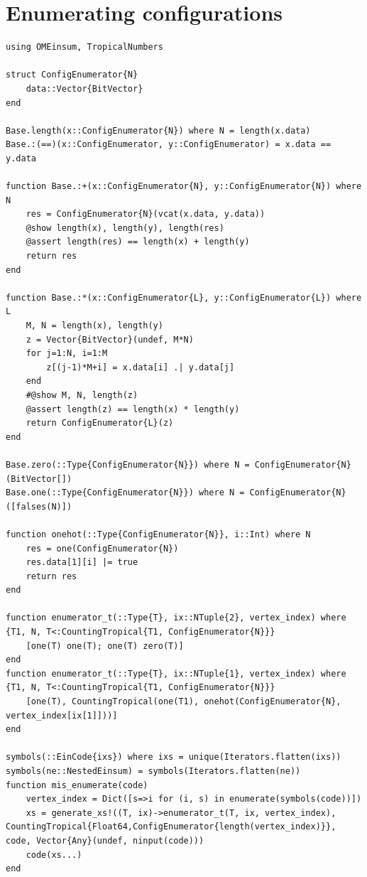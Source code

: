 \documentclass{article}
\newcommand{\<}{\langle}
\renewcommand{\>}{\rangle}
\theoremstyle{definition}\newtheorem{definition}{\textit{Definition}}
\begin{document}
\section{Enumerating configurations}
\begin{lstlisting}
using OMEinsum, TropicalNumbers

struct ConfigEnumerator{N}
    data::Vector{BitVector}
end

Base.length(x::ConfigEnumerator{N}) where N = length(x.data)
Base.:(==)(x::ConfigEnumerator, y::ConfigEnumerator) = x.data == y.data

function Base.:+(x::ConfigEnumerator{N}, y::ConfigEnumerator{N}) where N
    res = ConfigEnumerator{N}(vcat(x.data, y.data))
    @show length(x), length(y), length(res)
    @assert length(res) == length(x) + length(y)
    return res
end

function Base.:*(x::ConfigEnumerator{L}, y::ConfigEnumerator{L}) where L
    M, N = length(x), length(y)
    z = Vector{BitVector}(undef, M*N)
    for j=1:N, i=1:M
        z[(j-1)*M+i] = x.data[i] .| y.data[j]
    end
    #@show M, N, length(z)
    @assert length(z) == length(x) * length(y)
    return ConfigEnumerator{L}(z)
end

Base.zero(::Type{ConfigEnumerator{N}}) where N = ConfigEnumerator{N}(BitVector[])
Base.one(::Type{ConfigEnumerator{N}}) where N = ConfigEnumerator{N}([falses(N)])

function onehot(::Type{ConfigEnumerator{N}}, i::Int) where N
    res = one(ConfigEnumerator{N})
    res.data[1][i] |= true
    return res
end

function enumerator_t(::Type{T}, ix::NTuple{2}, vertex_index) where {T1, N, T<:CountingTropical{T1, ConfigEnumerator{N}}}
    [one(T) one(T); one(T) zero(T)]
end
function enumerator_t(::Type{T}, ix::NTuple{1}, vertex_index) where {T1, N, T<:CountingTropical{T1, ConfigEnumerator{N}}}
    [one(T), CountingTropical(one(T1), onehot(ConfigEnumerator{N}, vertex_index[ix[1]]))]
end

symbols(::EinCode{ixs}) where ixs = unique(Iterators.flatten(ixs))
symbols(ne::NestedEinsum) = symbols(Iterators.flatten(ne))
function mis_enumerate(code)
    vertex_index = Dict([s=>i for (i, s) in enumerate(symbols(code))])
	xs = generate_xs!((T, ix)->enumerator_t(T, ix, vertex_index), CountingTropical{Float64,ConfigEnumerator{length(vertex_index)}}, code, Vector{Any}(undef, ninput(code)))
	code(xs...)
end
\end{lstlisting}
\end{document}
